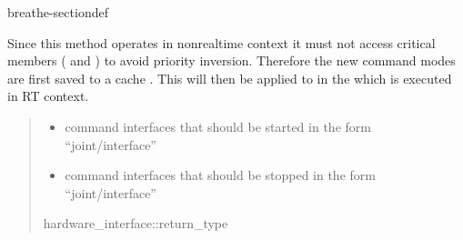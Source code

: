 \documentclass[letterpaper,10pt,english]{sphinxmanual}
\begin{document}
\begin{fulllineitems}
\begin{sphinxuseclass}{breathe-sectiondef}
\begin{fulllineitems}
Since this method operates in non\sphinxhyphen{}realtime context it must not access critical members ({\hyperref[\detokenize{code/bioscara_hardware_interfaces/index:classbioscara__hardware__interfaces_1_1BioscaraArmHardwareInterface_1afc419a32f050cf461e64d958fed917ce}]{}} and {\hyperref[\detokenize{code/bioscara_hardware_interfaces/index:classbioscara__hardware__interfaces_1_1BioscaraArmHardwareInterface_1a99e93a65247944cf62e75767ba98a656}]{}}) to avoid priority inversion. Therefore the new command modes are first saved to a cache {\hyperref[\detokenize{code/bioscara_hardware_interfaces/index:classbioscara__hardware__interfaces_1_1BioscaraArmHardwareInterface_1a222af12f49df8ea14f9d0d44a92e9617}]{}}. This will then be applied to {\hyperref[\detokenize{code/bioscara_hardware_interfaces/index:classbioscara__hardware__interfaces_1_1BioscaraArmHardwareInterface_1afc419a32f050cf461e64d958fed917ce}]{}} in the {\hyperref[\detokenize{code/bioscara_hardware_interfaces/index:classbioscara__hardware__interfaces_1_1BioscaraArmHardwareInterface_1a06406f562da286f933b52b6e7009bd7f}]{}} which is executed in RT context.
\begin{quote}\begin{description}
\begin{itemize}
\item {} 
\sphinxAtStartPar
{} \textendash{} command interfaces that should be started in the form “joint/interface” 

\item {} 
\sphinxAtStartPar
{} \textendash{} command interfaces that should be stopped in the form “joint/interface” 

\end{itemize}

\sphinxAtStartPar
hardware\_interface::return\_type 

\end{description}\end{quote}

\end{fulllineitems}


\end{sphinxuseclass}
\end{fulllineitems}
\end{document}
